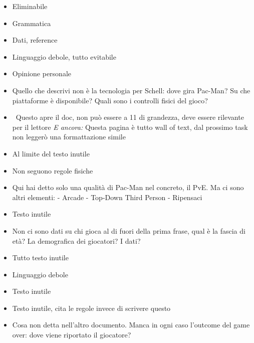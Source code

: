 {\begin{itemize}
  \item {} Eliminabile
  \item {} Grammatica
  \item {} Dati, reference
  \item {} Linguaggio debole, tutto evitabile
  \item {} Opinione personale
  \item {} Quello che descrivi non è la tecnologia per Schell: dove gira Pac-Man? Su che piattaforme è disponibile? Quali sono i controlli fisici del gioco?
  \item {} \rvAvviso\ Questo apre il doc, non può essere a 11 di grandezza, deve essere rilevante per il lettore \emph{E ancora:} Questa pagina è tutto wall of text, dal prossimo task non leggerò una formattazione simile
  \item {} Al limite del testo inutile
  \item {} Non seguono regole fisiche
  \item {} Qui hai detto solo una qualità di Pac-Man nel concreto, il PvE. Ma ci sono altri elementi: - Arcade - Top-Down Third Person - Ripensaci
  \item {} Testo inutile
  \item {} Non ci sono dati su chi gioca al di fuori della prima frase, qual è la fascia di età? La demografica dei giocatori? I dati?
  \item {} Tutto testo inutile
  \item {} Linguaggio debole
  \item {} Testo inutile
  \item {} Testo inutile, cita le regole invece di scrivere questo
  \item {} Cosa non detta nell'altro documento. Manca in ogni caso l'outcome del game over: dove viene riportato il giocatore?

\end{itemize}}
